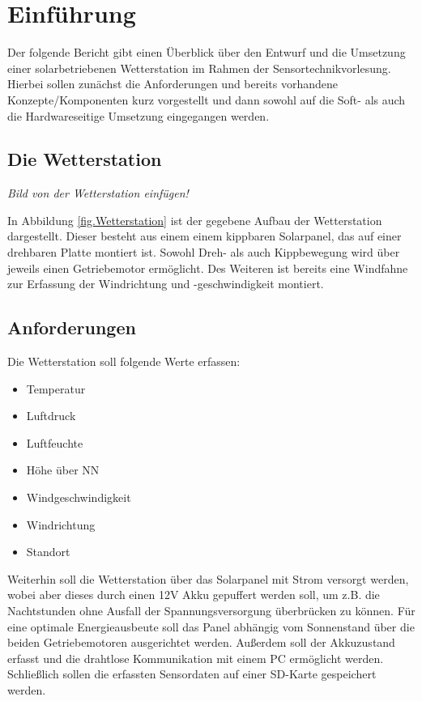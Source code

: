 \section{Einführung}\label{sec:einfuehrung}
Der folgende Bericht gibt einen Überblick über den Entwurf und die Umsetzung einer solarbetriebenen Wetterstation im Rahmen der Sensortechnikvorlesung. Hierbei sollen zunächst die Anforderungen und bereits vorhandene Konzepte/Komponenten kurz vorgestellt und dann sowohl auf die Soft- als auch die Hardwareseitige Umsetzung eingegangen werden.

\subsection{Die Wetterstation}\label{subsec:Wetterstation}
\textit{Bild von der Wetterstation einfügen!}

In Abbildung \ref{fig.Wetterstation} ist der gegebene Aufbau der Wetterstation dargestellt. Dieser besteht aus einem einem kippbaren Solarpanel, das auf einer drehbaren Platte montiert ist. Sowohl Dreh- als auch Kippbewegung wird über jeweils einen Getriebemotor ermöglicht. Des Weiteren ist bereits eine Windfahne zur Erfassung der Windrichtung und -geschwindigkeit montiert.

\subsection{Anforderungen}\label{subsec:Anforderungen}
Die Wetterstation soll folgende Werte erfassen:

\begin{itemize}
\item Temperatur
\item Luftdruck
\item Luftfeuchte
\item Höhe über NN
\item Windgeschwindigkeit
\item Windrichtung
\item Standort
\end{itemize}

Weiterhin soll die Wetterstation über das Solarpanel mit Strom versorgt werden, wobei aber dieses durch einen 12V Akku gepuffert werden soll, um z.B. die Nachtstunden ohne Ausfall der Spannungsversorgung überbrücken zu können. Für eine optimale Energieausbeute soll das Panel abhängig vom Sonnenstand über die beiden Getriebemotoren ausgerichtet werden. Außerdem soll der Akkuzustand erfasst und die drahtlose Kommunikation mit einem PC ermöglicht werden. Schließlich sollen die erfassten Sensordaten auf einer SD-Karte gespeichert werden.


